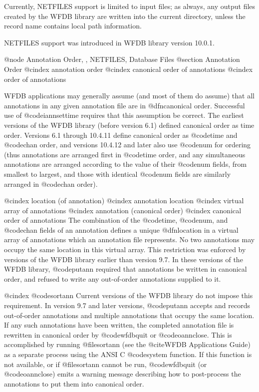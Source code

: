 {{{{{{{{{Currently, NETFILES support is limited to input files; as always, any output
files created by the WFDB library are written into the current directory,
unless the record name contains local path information.

NETFILES support was introduced in WFDB library version 10.0.1.

@node     Annotation Order, , NETFILES, Database Files
@section Annotation Order
@cindex annotation order
@cindex canonical order of annotations
@cindex order of annotations

WFDB applications may generally assume (and most of them do assume) that all
annotations in any given annotation file are in @dfn{canonical order}.
Successful use of @code{iannsettime} requires that this assumption be correct.
The earliest versions of the WFDB library (before version 6.1) defined
canonical order as time order.  Versions 6.1 through 10.4.11 define canonical
order as @code{time} and @code{chan} order, and versions 10.4.12 and later also
use @code{num} for ordering (thus annotations are arranged first in @code{time}
order, and any simultaneous annotations are arranged according to the value of
their @code{num} fields, from smallest to largest, and those with identical
@code{num} fields are similarly arranged in @code{chan} order).

@cindex location (of annotation)
@cindex annotation location
@cindex virtual array of annotations
@cindex annotation (canonical order)
@cindex canonical order of annotations
The combination of the @code{time}, @code{num}, and @code{chan} fields of an
annotation defines a unique @dfn{location} in a virtual array of
annotations which an annotation file represents.  No two annotations may
occupy the same location in this virtual array.  This restriction was
enforced by versions of the WFDB library earlier than version 9.7.  In
these versions of the WFDB library, @code{putann} required that
annotations be written in canonical order, and refused to write any
out-of-order annotations supplied to it.

@cindex @code{sortann}
Current versions of the WFDB library do not impose this requirement.  In version
9.7 and later versions, @code{putann} accepts and records out-of-order
annotations and multiple annotations that occupy the same location.  If any
such annotations have been written, the completed annotation file is rewritten
in canonical order by @code{wfdbquit} or @code{oannclose}.  This is accomplished
by running @file{sortann} (see the @cite{WFDB Applications
Guide}) as a separate process using the ANSI C @code{system} function.  If this
function is not available, or if @file{sortann} cannot be run, @code{wfdbquit}
(or @code{oannclose}) emits a warning message describing how to post-process
the annotations to put them into canonical order.

}}}}}}}}}
